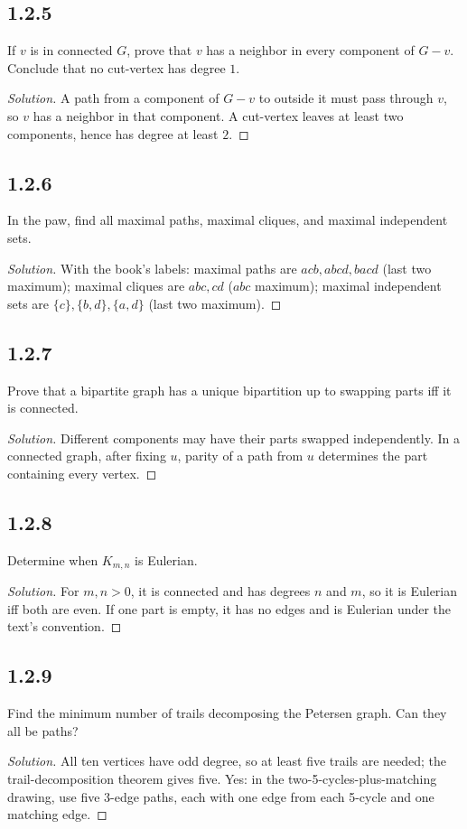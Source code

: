 \documentclass[12pt]{amsart}
\newenvironment{solution}{\begin{proof}[Solution]}{\end{proof}}
\begin{document}
    \subsection*{1.2.5} If $v$ is in connected $G$, prove that $v$ has a neighbor in every component of $G-v$. Conclude that no cut-vertex has degree $1$.
    \begin{solution}A path from a component of $G-v$ to outside it must pass through $v$, so $v$ has a neighbor in that component. A cut-vertex leaves at least two components, hence has degree at least $2$.\end{solution}
    \subsection*{1.2.6} In the paw, find all maximal paths, maximal cliques, and maximal independent sets.
    \begin{solution}With the book's labels: maximal paths are $acb,abcd,bacd$ (last two maximum); maximal cliques are $abc,cd$ ($abc$ maximum); maximal independent sets are $\{c\},\{b,d\},\{a,d\}$ (last two maximum).\end{solution}
    \subsection*{1.2.7} Prove that a bipartite graph has a unique bipartition up to swapping parts iff it is connected.
    \begin{solution}Different components may have their parts swapped independently. In a connected graph, after fixing $u$, parity of a path from $u$ determines the part containing every vertex.\end{solution}
    \subsection*{1.2.8} Determine when $K_{m,n}$ is Eulerian.
    \begin{solution}For $m,n>0$, it is connected and has degrees $n$ and $m$, so it is Eulerian iff both are even. If one part is empty, it has no edges and is Eulerian under the text's convention.\end{solution}
    \subsection*{1.2.9} Find the minimum number of trails decomposing the Petersen graph. Can they all be paths?
    \begin{solution}All ten vertices have odd degree, so at least five trails are needed; the trail-decomposition theorem gives five. Yes: in the two-5-cycles-plus-matching drawing, use five 3-edge paths, each with one edge from each 5-cycle and one matching edge.\end{solution}
\end{document}
